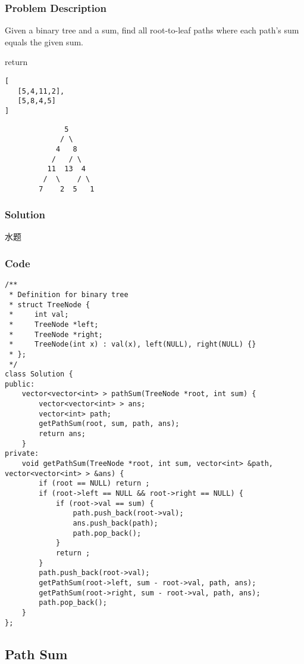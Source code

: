 \documentclass[courier]{article}
\begin{document}
\begin{CJK*}{UTF8}{gkai}
\subsubsection*{Problem Description}
Given a binary tree and a sum, find all root-to-leaf paths where each path's sum equals the given sum.

return


\begin{verbatim}
[
   [5,4,11,2],
   [5,8,4,5]
]
\end{verbatim}

\begin{verbatim}
              5
             / \
            4   8
           /   / \
          11  13  4
         /  \    / \
        7    2  5   1
\end{verbatim}


\subsubsection*{Solution}
水题

\subsubsection*{Code}
\begin{lstlisting}
/**
 * Definition for binary tree
 * struct TreeNode {
 *     int val;
 *     TreeNode *left;
 *     TreeNode *right;
 *     TreeNode(int x) : val(x), left(NULL), right(NULL) {}
 * };
 */
class Solution {
public:
    vector<vector<int> > pathSum(TreeNode *root, int sum) {
        vector<vector<int> > ans;
        vector<int> path;
        getPathSum(root, sum, path, ans);
        return ans;
    }
private:
    void getPathSum(TreeNode *root, int sum, vector<int> &path, vector<vector<int> > &ans) {
        if (root == NULL) return ;
        if (root->left == NULL && root->right == NULL) {
            if (root->val == sum) {
                path.push_back(root->val);
                ans.push_back(path);
                path.pop_back();
            }
            return ;
        }
        path.push_back(root->val);
        getPathSum(root->left, sum - root->val, path, ans);
        getPathSum(root->right, sum - root->val, path, ans);
        path.pop_back();
    }
};

\end{lstlisting}


\subsection{ Path Sum }


\end{CJK*}
\end{document}
